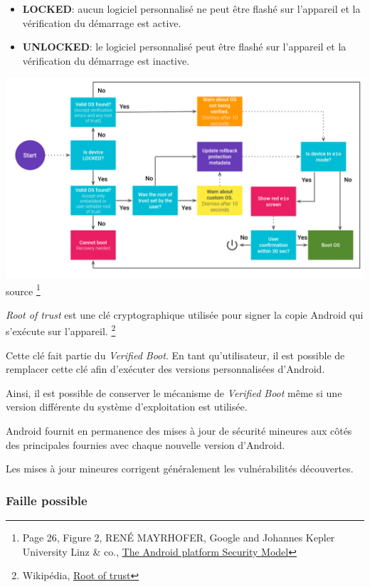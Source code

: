 \documentclass[
  french,
  paper=a4,
  ,captions=tableheading
]{scrartcl}
\begin{document}
\begin{itemize}
\item
  \textbf{LOCKED}: aucun logiciel personnalisé ne peut être flashé sur
  l'appareil et la vérification du démarrage est active.
\item
  \textbf{UNLOCKED}: le logiciel personnalisé peut être flashé sur
  l'appareil et la vérification du démarrage est inactive.
\end{itemize}

\includegraphics{verified_boot.png} source \footnote{Page 26, Figure 2,
  RENÉ MAYRHOFER, Google and Johannes Kepler University Linz \& co.,
  \href{https://arxiv.org/pdf/1904.05572.pdf}{The Android platform
  Security Model}}

\emph{Root of trust} est une clé cryptographique utilisée pour signer la
copie Android qui s'exécute sur l'appareil. \footnote{Wikipédia,
  \href{https://source.android.com/security/verifiedboot/device-state\#:~:text=Root\%20of\%20trust\%20is\%20the,of\%20Android\%20intended\%20for\%20distribution.}{Root
  of trust}}

Cette clé fait partie du \emph{Verified Boot}. En tant qu'utilisateur,
il est possible de remplacer cette clé afin d'exécuter des versions
personnalisées d'Android.

Ainsi, il est possible de conserver le mécanisme de \emph{Verified Boot}
même si une version différente du système d'exploitation est utilisée.

Android fournit en permanence des mises à jour de sécurité mineures aux
côtés des principales fournies avec chaque nouvelle version d'Android.

Les mises à jour mineures corrigent généralement les vulnérabilités
découvertes.

\hypertarget{faille-possible}{%
\subsubsection{Faille possible}\label{faille-possible}}
\end{document}
